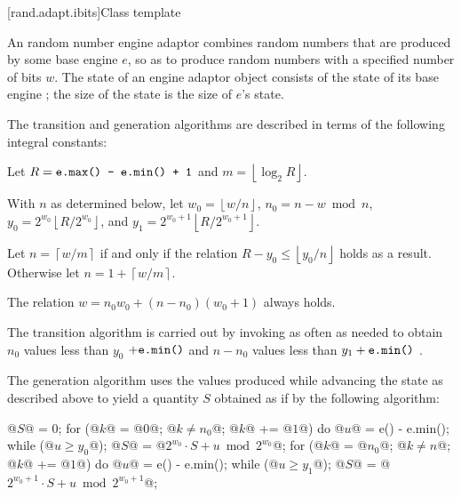 
[rand.adapt.ibits]{Class template }%
%

\pnum
An 
random number engine adaptor
combines random numbers
that are produced by some base engine $e$,
so as to produce random numbers
with a specified number of bits $w$.
The state%
%
of an 
engine adaptor object 
consists of
 the state  of its base engine ;
the size of the state is
 the size of $e$'s state.

\pnum
The transition and generation algorithms
are described in terms
of the following integral constants:%
\begin{enumeratea}
 \item
   Let
     $ R = \texttt{e.max() - e.min() + 1} $
   and
     $ m = \left\lfloor \log_2 R \right\rfloor $.
 \item
   With $n$ as determined below,
   let
     $ w_0 = \left\lfloor w / n \right\rfloor $,
     $ n_0 = n - w \bmod n $,
     $ y_0 = 2^{w_0} \left\lfloor R / 2^{w_0} \right\rfloor $,
   and
     $ y_1 = 2^{w_0 + 1} \left\lfloor R / 2^{w_0 + 1} \right\rfloor $.
 \item
   Let
     $ n = \left\lceil w / m \right\rceil $
   if and only if the relation
     $ R - y_0 \leq \left\lfloor y_0 / n \right\rfloor $
   holds as a result.
   Otherwise let
     $ n = 1 + \left\lceil w / m \right\rceil $.
\end{enumeratea}
\enternote
 The relation
 $ w = n_0 w_0 + (n - n_0)(w_0 + 1) $
 always holds.
\exitnote

\pnum
The transition algorithm%
%
is carried out
by invoking 
as often as needed
to obtain
 $ n_0 $
values less than
$ y_0 $ $ + \texttt{e.min()} $
and
 $ n - n_0 $
values less than $ y_1 + \texttt{e.min()} $%
.

\pnum
The generation algorithm%
%
uses the values produced
while advancing the state as described above
to yield a quantity $S$
obtained as if by the following algorithm:
\begin{codeblock}
@$S$@ = 0;
for (@$k$@ = @$0$@; @$k \neq n_0$@; @$k$@ += @$1$@)  {
 do @$u$@ = e() - e.min(); while (@$ u \ge y_0 $@);
 @$S$@ = @$ 2^{w_0} \cdot S + u \bmod 2^{w_0} $@;
}
for (@$k$@ = @$n_0$@; @$k \neq n$@; @$k$@ += @$1$@)  {
 do @$u$@ = e() - e.min(); while (@$ u \ge y_1 $@);
 @$S$@ = @$ 2^{w_0 + 1} \cdot S + u \bmod 2^{w_0 + 1} $@;
}
\end{codeblock}


